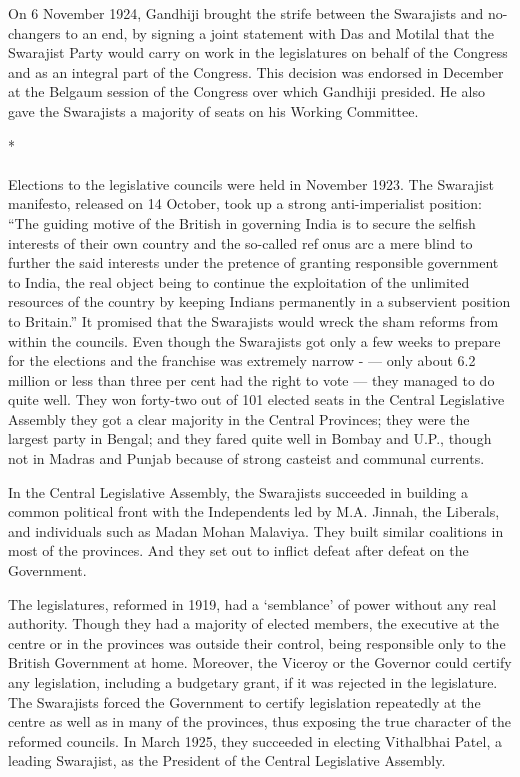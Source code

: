 \begin{multicols}{2}
On 6 November 1924, Gandhiji brought the strife between the Swarajists and no-changers to an end, by signing a joint statement with Das and Motilal that the Swarajist Party would carry on work in the legislatures on behalf of the Congress and as an integral part of the Congress. This decision was endorsed in December at the Belgaum session of the Congress over which Gandhiji presided. He also gave the Swarajists a majority of seats on his Working Committee.

\begin{center}*\end{center}

\paragraph*{}
Elections to the legislative councils were held in November 1923. The Swarajist manifesto, released on 14 October, took up a strong anti-imperialist position: ``The guiding motive of the British in governing India is to secure the selfish interests of their own country and the so-called ref onus arc a mere blind to further the said interests under the pretence of granting responsible government to India, the real object being to continue the exploitation of the unlimited resources of the country by keeping Indians permanently in a subservient position to Britain.'' It promised that the Swarajists would wreck the sham reforms from within the councils. Even though the Swarajists got only a few weeks to prepare for the elections and the franchise was extremely narrow - --- only about 6.2 million or less than three per cent had the right to vote --- they managed to do quite well. They won forty-two out of 101 elected seats in the Central Legislative Assembly they got a clear majority in the Central Provinces; they were the largest party in Bengal; and they fared quite well in Bombay and U.P., though not in Madras and Punjab because of strong casteist and communal currents.

In the Central Legislative Assembly, the Swarajists succeeded in building a common political front with the Independents led by M.A. Jinnah, the Liberals, and individuals such as Madan Mohan Malaviya. They built similar coalitions in most of the provinces. And they set out to inflict defeat after defeat on the Government.

The legislatures, reformed in 1919, had a `semblance' of power without any real authority. Though they had a majority of elected members, the executive at the centre or in the provinces was outside their control, being responsible only to the British Government at home. Moreover, the Viceroy or the Governor could certify any legislation, including a budgetary grant, if it was rejected in the legislature. The Swarajists forced the Government to certify legislation repeatedly at the centre as well as in many of the provinces, thus exposing the true character of the reformed councils. In March 1925, they succeeded in electing Vithalbhai Patel, a leading Swarajist, as the President of the Central Legislative Assembly.


\end{multicols}
